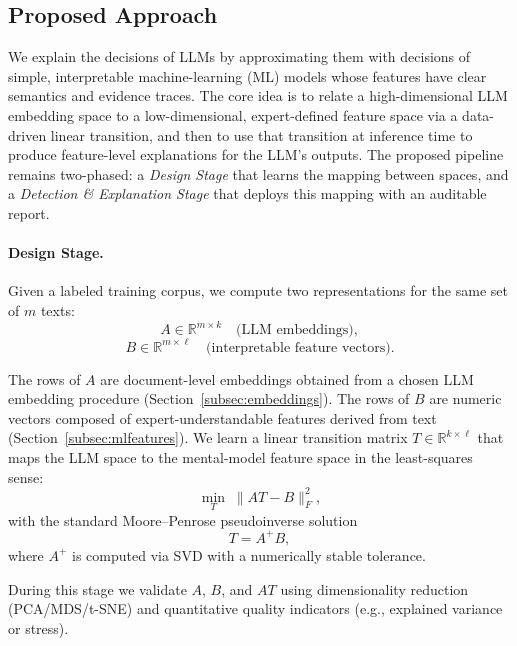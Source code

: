 \documentclass[ai,article,submit,pdftex,moreauthors]{Definitions/mdpi}
\begin{document}
\subsection{Proposed Approach}\label{subsec:approach}
We explain the decisions of LLMs by approximating them with decisions of simple, interpretable machine-learning (ML) models whose features have clear semantics and evidence traces. The core idea is to relate a high-dimensional LLM embedding space to a low-dimensional, expert-defined feature space via a data-driven linear transition, and then to use that transition at inference time to produce feature-level explanations for the LLM's outputs. The proposed pipeline remains two-phased: a \emph{Design Stage} that learns the mapping between spaces, and a \emph{Detection \& Explanation Stage} that deploys this mapping with an auditable report.

\paragraph{Design Stage.}
Given a labeled training corpus, we compute two representations for the same set of $m$ texts:
\begin{equation}\label{eq:Adef}
A \in \mathbb{R}^{m \times k} \quad \text{(LLM embeddings)},
\end{equation}
\begin{equation}\label{eq:Bdef}
B \in \mathbb{R}^{m \times \ell} \quad \text{(interpretable feature vectors)}.
\end{equation}

The rows of $A$ are document-level embeddings obtained from a chosen LLM embedding procedure (Section~\ref{subsec:embeddings}). The rows of $B$ are numeric vectors composed of expert-understandable features derived from text (Section~\ref{subsec:mlfeatures}). We learn a linear transition matrix $T \in \mathbb{R}^{k \times \ell}$ that maps the LLM space to the mental-model feature space in the least-squares sense:
\begin{equation}\label{eq:ls}
\min_{T}\;\|AT - B\|_F^2,
\end{equation}
with the standard Moore--Penrose pseudoinverse solution
\begin{equation}\label{eq:T}
T = A^{+} B,
\end{equation}
where $A^{+}$ is computed via SVD with a numerically stable tolerance.

During this stage we validate $A$, $B$, and $AT$ using dimensionality reduction (PCA/MDS/t-SNE) and quantitative quality indicators (e.g., explained variance or stress).
\end{document}
